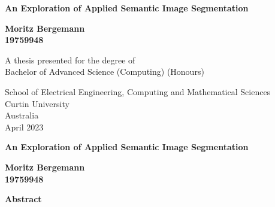 \documentclass[a4paper,12pt]{report}
\begin{document}
{}
\begin{titlepage}
    \begin{center}
        \vspace*{0.5cm}

        \LARGE
        \textbf{An Exploration of Applied Semantic Image Segmentation}


        \vspace{1.0cm}
        \Large

        \textbf{Moritz Bergemann\\ 19759948}

        \vfill

        A thesis presented for the degree of\\
        Bachelor of Advanced Science (Computing) (Honours)

        \vspace{2.5cm}


        \large
        School of Electrical Engineering, Computing and Mathematical Sciences\\
        Curtin University\\
        Australia\\
        April 2023

    \end{center}
\end{titlepage}

\thispagestyle{plain}
\begin{center}
    \Large
    \textbf{An Exploration of Applied Semantic Image Segmentation}

    \vspace{0.4cm}
    \large

    \vspace{0.4cm}
    \textbf{Moritz Bergemann\\ 19759948}

    \vspace{0.9cm}
    \textbf{Abstract}
\end{center}
\end{document}
